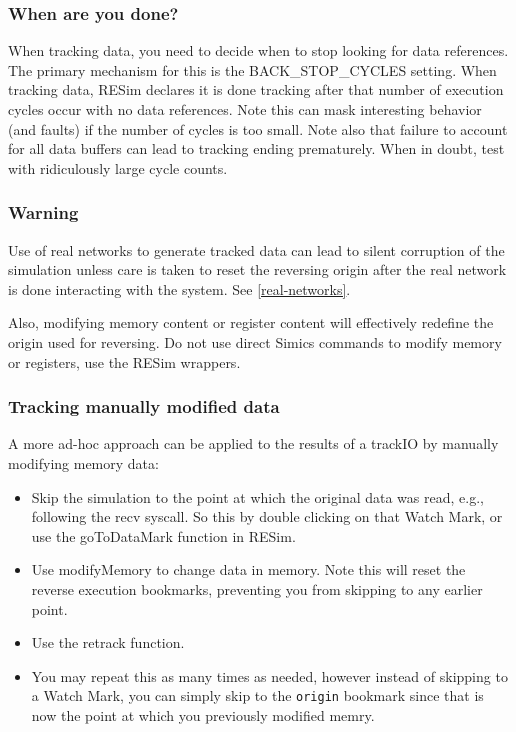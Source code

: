 \documentclass[titlepage]{article}
\begin{document}
\subsubsection{When are you done?}
When tracking data, you need to decide when to stop looking for data references.  The primary mechanism for this is the BACK\_STOP\_CYCLES
setting.  When tracking data, RESim declares it is done tracking after that number of execution cycles occur with no data references.
Note this can mask interesting behavior (and faults) if the number of cycles is too small.  Note also that failure to account for all data
buffers can lead to tracking ending prematurely.  When in doubt, test with ridiculously large cycle counts.

\subsubsection{Warning}
Use of real networks to generate tracked data can lead to silent corruption of the simulation unless care is taken to reset the reversing origin
after the real network is done interacting with the system.  See \ref{real-networks}.

Also, modifying memory content or register content will effectively redefine the origin used for reversing.  Do not use direct Simics commands to modify 
memory or registers, use the RESim wrappers.

\subsubsection{Tracking manually modified data}
A more ad-hoc approach can be applied to the results of a trackIO by manually modifying memory data:
\begin{itemize}
\item Skip the simulation to the point at which the original data was read, e.g., following the recv syscall.  So this by double clicking
on that Watch Mark, or use the goToDataMark function in RESim.
\item Use modifyMemory to change data in memory.  Note this will reset the reverse execution bookmarks, preventing you from skipping to
any earlier point.
\item Use the retrack function.
\item You may repeat this as many times as needed, however instead of skipping to a Watch Mark, you can simply skip to the {\tt origin}
bookmark since that is now the point at which you previously modified memry.
\end{itemize}
\end{document}
